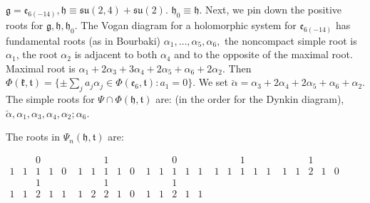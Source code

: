 \documentclass[12pt]{amsart}
\theoremstyle{definition}
\theoremstyle{remark}
\newcommand{\e}{\mathfrak{e}}
\newcommand{\g}{\mathfrak{g}}
\newcommand{\h}{\mathfrak{h}}
\renewcommand{\k}{{\mathfrak k}}
\renewcommand{\t}{{\mathfrak t}}
\numberwithin{equation}{section}
\begin{document}
\subsubsection{}\label{sub:e6su24}$\g=\e_{6(-14)}, \h\equiv \mathfrak{su}(2,4) +\mathfrak{su}(2)$. $\h_0 \equiv \h$.
 Next, we pin down the positive roots for $\g, \h, \h_0$. The Vogan diagram for a holomorphic system for $\mathfrak e_{6(-14)}$ has fundamental roots (as in Bourbaki) $\alpha_1, \dots, \alpha_5, \alpha_6, $  the noncompact simple root is $\alpha_1$, the root $\alpha_2$ is  adjacent to both $\alpha_4$ and to the opposite of the maximal root. Maximal root is $\alpha_1 +2\alpha_3 +3 \alpha_4+2 \alpha_5+\alpha_6 +2\alpha_2$. Then $\Phi(\k,\t)= \{\pm \sum_j a_j \alpha_j \in \Phi(\mathfrak e_6,\mathfrak t) :    a_1=0\}$. We set $\breve{\alpha}=\alpha_3+ 2\alpha_4+2\alpha_5+\alpha_6+\alpha_2$. The simple roots for $\Psi \cap \Phi(\h,\t)$ are: (in the order for the Dynkin diagram), $\breve{\alpha}, \alpha_1, \alpha_3, \alpha_4, \alpha_2; \alpha_6$.

 The roots in $\Psi_n(\h,  \t)$ are:

$
\begin{smallmatrix}
    &   & 0 &   &   \\
  1& 1 & 1 & 1 & 0
\end{smallmatrix}
$
$\begin{smallmatrix}
   &  & 1 &   &  \\
   1 & 1 & 1& 1 & 0
 \end{smallmatrix}
 $
$\begin{smallmatrix}
   &  &  0 &   &  \\
   1 & 1 & 1 & 1 & 1
 \end{smallmatrix}
 $
 $\begin{smallmatrix}
   &  &  1 &   &  \\
   1 & 1 & 1 & 1 & 1
 \end{smallmatrix}
 $
 $\begin{smallmatrix}
   &  &  1 &   &  \\
   1 & 1 & 2 & 1 & 0
 \end{smallmatrix}
 $
 $\begin{smallmatrix}
   &  &  1 &   &  \\
   1 & 1& 2 & 1 & 1
 \end{smallmatrix}
 $
 $\begin{smallmatrix}
   &  &  1 &   &  \\
   1 & 2 & 2 & 1& 0
 \end{smallmatrix}
 $
 $\begin{smallmatrix}
   &  & 1&   &  \\
   1 & 1 & 2 & 1 & 1
 \end{smallmatrix}
 $
\end{document}
